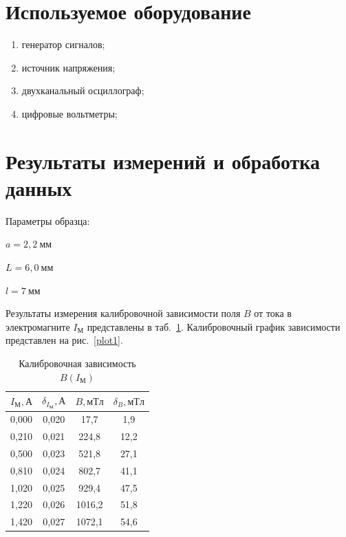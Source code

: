 \documentclass[a4paper, 12pt]{article}
\begin{document}
\section{Используемое оборудование}

\begin{enumerate}
    \item генератор сигналов;
    \item источник напряжения;
    \item двухканальный осциллограф;
    \item цифровые вольтметры;
\end{enumerate}

\section{Результаты измерений и обработка данных}

Параметры образца:
\begin{description}
\item{} $a = 2,2~мм$
\item{} $L = 6,0~мм$
\item{} $l = 7~мм$
\end{description}

Результаты измерения калибровочной зависимости поля $B$ от тока в электромагните $I_М$ представлены в таб.~\ref{tab1}. Калибровочный график зависимости представлен на рис.~\ref{plot1}.

\begin{table}[h!]
\begin{center}
\begin{tabular}{|c|c|c|c|}
\hline
$I_М, А$ & $\delta_{I_М}, А$ & $B, мТл$ & $\delta_B, мТл$ \\ \hline
0,000 & 0,020  & 17,7   & 1,9     \\ \hline
0,210 & 0,021  & 224,8  & 12,2    \\ \hline
0,500 & 0,023  & 521,8  & 27,1    \\ \hline
0,810 & 0,024  & 802,7  & 41,1    \\ \hline
1,020 & 0,025  & 929,4  & 47,5    \\ \hline
1,220 & 0,026  & 1016,2 & 51,8    \\ \hline
1,420 & 0,027  & 1072,1 & 54,6    \\ \hline
\end{tabular}
\end{center}
\caption{Калибровочная зависимость $B(I_М)$}
\label{tab1}
\end{table}
\end{document}
